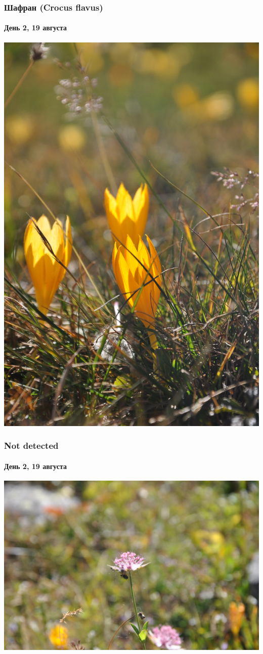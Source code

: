 \begin{frame}
	\frametitle{Шафран (Crocus flavus)}
	\framesubtitle{День 2, 19 августа}
	\centering
	\includegraphics[width=\linewidth]{../pics/DSC_0725}
	\end{frame}

\begin{frame}
	\frametitle{Not detected}
	\framesubtitle{День 2, 19 августа}
	\centering
	\includegraphics[width=\linewidth]{../pics/DSC_0732}
\end{frame}

